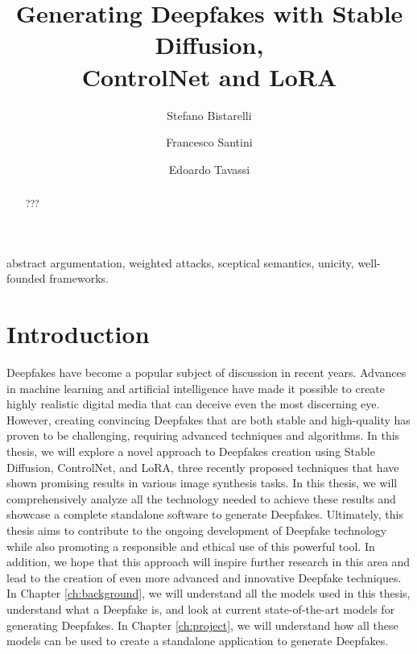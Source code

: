 \documentclass[preprint]{elsarticle}
\begin{document}
\begin{frontmatter}


\title{Generating Deepfakes with Stable Diffusion,\\ ControlNet and LoRA}





\author[perugia]{Stefano Bistarelli}
\author[perugia]{Francesco Santini}
\author[perugia]{Edoardo Tavassi}


\address[perugia]{Dipartimento di Matematica e  Informatica, University of Perugia, Italy}




\begin{abstract} 
???
\end{abstract}

\begin{keyword}
abstract argumentation, weighted attacks, sceptical semantics, unicity, well-founded frameworks.
\end{keyword}
\end{frontmatter}



\section{Introduction}


Deepfakes have become a popular subject of discussion in recent years. 
Advances in machine learning and artificial intelligence have made it possible to 
create highly realistic digital media that can deceive even the most discerning eye. 
However, creating convincing Deepfakes that are both stable and high-quality has proven 
to be challenging, requiring advanced techniques and algorithms. 
In this thesis, we will explore a novel approach to Deepfakes creation using 
Stable Diffusion, ControlNet, and LoRA, three recently proposed techniques that 
have shown promising results in various image synthesis tasks. 
In this thesis, we will comprehensively analyze all the technology needed to achieve these 
results and showcase a complete standalone software to generate Deepfakes. 
Ultimately, this thesis aims to contribute to the ongoing development of 
Deepfake technology while also promoting a responsible and ethical use of this powerful tool. 
In addition, we hope that this approach will inspire further research in this area and 
lead to the creation of even more advanced and innovative Deepfake techniques.
In Chapter \ref{ch:background}, we will understand all the models used in this thesis, understand what a Deepfake is, and look at current state-of-the-art models for generating Deepfakes.
In Chapter \ref{ch:project}, we will understand how all these models can be used to create a standalone application to generate Deepfakes.
\end{document}
